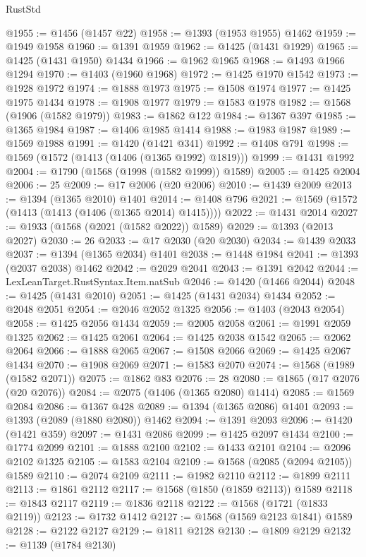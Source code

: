 \begin{lexlean}{RustStd}
\begin{coremodule}
@1955 := @1456 (@1457 @22)
@1958 := @1393 (@1953 @1955) @1462
@1959 := @1949 @1958
@1960 := @1391 @1959
@1962 := @1425 (@1431 @1929)
@1965 := @1425 (@1431 @1950) @1434
@1966 := @1962 @1965
@1968 := @1493 @1966 @1294
@1970 := @1403 (@1960 @1968)
@1972 := @1425 @1970 @1542
@1973 := @1928 @1972
@1974 := @1888 @1973
@1975 := @1508 @1974
@1977 := @1425 @1975 @1434
@1978 := @1908 @1977
@1979 := @1583 @1978
@1982 := @1568 (@1906 (@1582 @1979))
@1983 := @1862 @122
@1984 := @1367 @397
@1985 := @1365 @1984
@1987 := @1406 @1985 @1414
@1988 := @1983 @1987
@1989 := @1569 @1988
@1991 := @1420 (@1421 @341)
@1992 := @1408 @791
@1998 := @1569 (@1572 (@1413 (@1406 (@1365 @1992) @1819)))
@1999 := @1431 @1992
@2004 := @1790 (@1568 (@1998 (@1582 @1999)) @1589)
@2005 := @1425 @2004
@2006 := 25
@2009 := @17 @2006 (@20 @2006)
@2010 := @1439 @2009
@2013 := @1394 (@1365 @2010) @1401
@2014 := @1408 @796
@2021 := @1569 (@1572 (@1413 (@1413 (@1406 (@1365 @2014) @1415))))
@2022 := @1431 @2014
@2027 := @1933 (@1568 (@2021 (@1582 @2022)) @1589)
@2029 := @1393 (@2013 @2027)
@2030 := 26
@2033 := @17 @2030 (@20 @2030)
@2034 := @1439 @2033
@2037 := @1394 (@1365 @2034) @1401
@2038 := @1448 @1984
@2041 := @1393 (@2037 @2038) @1462
@2042 := @2029 @2041
@2043 := @1391 @2042
@2044 := LexLeanTarget.RustSyntax.Item.natSub
@2046 := @1420 (@1466 @2044)
@2048 := @1425 (@1431 @2010)
@2051 := @1425 (@1431 @2034) @1434
@2052 := @2048 @2051
@2054 := @2046 @2052 @1325
@2056 := @1403 (@2043 @2054)
@2058 := @1425 @2056 @1434
@2059 := @2005 @2058
@2061 := @1991 @2059 @1325
@2062 := @1425 @2061
@2064 := @1425 @2038 @1542
@2065 := @2062 @2064
@2066 := @1888 @2065
@2067 := @1508 @2066
@2069 := @1425 @2067 @1434
@2070 := @1908 @2069
@2071 := @1583 @2070
@2074 := @1568 (@1989 (@1582 @2071))
@2075 := @1862 @83
@2076 := 28
@2080 := @1865 (@17 @2076 (@20 @2076))
@2084 := @2075 (@1406 (@1365 @2080) @1414)
@2085 := @1569 @2084
@2086 := @1367 @428
@2089 := @1394 (@1365 @2086) @1401
@2093 := @1393 (@2089 (@1880 @2080)) @1462
@2094 := @1391 @2093
@2096 := @1420 (@1421 @359)
@2097 := @1431 @2086
@2099 := @1425 @2097 @1434
@2100 := @1774 @2099
@2101 := @1888 @2100
@2102 := @1433 @2101
@2104 := @2096 @2102 @1325
@2105 := @1583 @2104
@2109 := @1568 (@2085 (@2094 @2105)) @1589
@2110 := @2074 @2109
@2111 := @1982 @2110
@2112 := @1899 @2111
@2113 := @1861 @2112
@2117 := @1568 (@1850 (@1859 @2113)) @1589
@2118 := @1843 @2117
@2119 := @1836 @2118
@2122 := @1568 (@1721 (@1833 @2119))
@2123 := @1732 @1412
@2127 := @1568 (@1569 @2123 @1841) @1589
@2128 := @2122 @2127
@2129 := @1811 @2128
@2130 := @1809 @2129
@2132 := @1139 (@1784 @2130)

\end{coremodule}
\end{lexlean}
